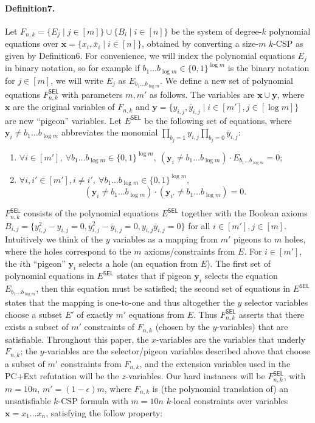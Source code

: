 \paragraph{Definition7.}
Let $F_{n,k}=\{E_j\mid j\in[m]\}\cup\{B_i\mid i\in[n]\}$ be the system of degree-$k$ polynomial equations over $\mathbf x=\{x_i,\bar x_i\mid i\in[n]\}$, obtained by converting a size-$m$ $k$-CSP as given by Definition6. For convenience, we will index the polynomial equations $E_j$ in binary notation, so for example if $b_1\ldots b_{\log m}\in\{0,1\}^{\log m}$ is the binary notation for $j\in[m]$, we will write $E_j$ as $E_{b_1\ldots b_{\log m}}$. We define a new set of polynomial equations $F^{\mathsf{SEL}}_{n,k}$ with parameters $m,m'$ as follows. The variables are $\mathbf x\cup\mathbf y$, where $\mathbf x$ are the original variables of $F_{n,k}$ and $\mathbf y=\{y_{i,j},\bar y_{i,j}\mid i\in[m'],j\in[\log m]\}$ are new ``pigeon'' variables. Let $E^{\mathsf{SEL}}$ be the following set of equations, where $\mathbf y_i\neq b_1\ldots b_{\log m}$ abbreviates the monomial $\prod_{b_j=1}y_{i,j}\prod_{b_j=0}\bar y_{i,j}$:
\begin{enumerate}[label=(\roman*)]
\item $\forall i\in[m'],\ \forall b_1\ldots b_{\log m}\in\{0,1\}^{\log m},\ (\mathbf y_i\neq b_1\ldots b_{\log m})\cdot E_{b_1\ldots b_{\log m}}=0$;
\item $\forall i,i'\in[m'],i\neq i',\ \forall b_1\ldots b_{\log m}\in\{0,1\}^{\log m},$
\[(\mathbf y_i\neq b_1\ldots b_{\log m})\cdot(\mathbf y_{i'}\neq b_1\ldots b_{\log m})=0.\]
\end{enumerate}
$F^{\mathsf{SEL}}_{n,k}$ consists of the polynomial equations $E^{\mathsf{SEL}}$ together with the Boolean axioms $B_{i,j}=\{y_{i,j}^2-y_{i,j}=0,\bar y_{i,j}^2-\bar y_{i,j}=0,y_{i,j}\bar y_{i,j}=0\}$ for all $i\in[m'],j\in[m]$.
Intuitively we think of the $y$ variables as a mapping from $m'$ pigeons to $m$ holes, where the holes correspond to the $m$ axioms/constraints from $E$. For $i\in[m']$, the $i$th ``pigeon'' $\mathbf y_i$ selects a hole (an equation from $E$).
The first set of polynomial equations in $E^{\mathsf{SEL}}$ states that if pigeon $\mathbf y_i$ selects the equation $E_{b_1\ldots b_{\log m}}$, then this equation must be satisfied; the second set of equations in $E^{\mathsf{SEL}}$ states that the mapping is one-to-one and thus altogether the $y$ selector variables choose a subset $E'$ of exactly $m'$ equations from $E$. Thus $F^{\mathsf{SEL}}_{n,k}$ asserts that there exists a subset of $m'$ constraints of $F_{n,k}$ (chosen by the $y$-variables) that are satisfiable.
Throughout this paper, the $x$-variables are the variables that underly $F_{n,k}$; the $y$-variables are the selector/pigeon variables described above that choose a subset of $m'$ constraints from $F_{n,k}$, and the extension variables used in the PC+Ext refutation will be the $z$-variables.
Our hard instances will be $F^{\mathsf{SEL}}_{n,k}$, with $m=10n$, $m'=(1-\epsilon)m$, where $F_{n,k}$ is (the polynomial translation of) an unsatisfiable $k$-CSP formula with $m=10n$ $k$-local constraints over variables $\mathbf x=x_1\ldots x_n$, satisfying the follow property:
